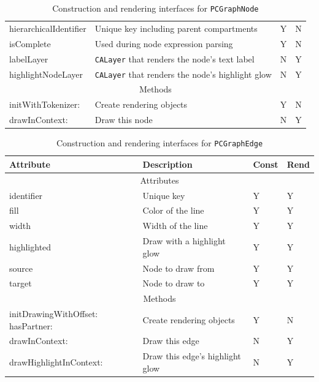 \begin{table}[htbp]
\begin{tabular}{ p{1.5in} p{3in} p{0.3in} p{0.3in}}
    hierarchicalIdentifier  & Unique key including parent compartments
    & Y & N \\
    isComplete & Used during node expression parsing
    & Y & N \\

    labelLayer  & \texttt{CALayer} that renders the node's text label
    & N & Y \\

    highlightNodeLayer  & \texttt{CALayer} that renders the node's highlight
    glow
    & N & Y \\

    \hline \multicolumn{4}{c}{Methods} \\ \hline

    initWithTokenizer: & Create rendering objects
    & Y & N \\

    drawInContext: & Draw this node
    & N & Y \\
\end{tabular}
    \caption{Construction and rendering interfaces for \texttt{PCGraphNode}}
    \label{fig:smda_node_interface}
\end{table}

\begin{table}[htbp]
\centering
\begin{tabular}{ p{1.5in} p{3in} p{0.3in} p{0.3in}}
    Attribute & Description & Const & Rend \\ \hline
    \hline \multicolumn{4}{c}{Attributes} \\ \hline

    identifier & Unique key  & Y & Y \\
    fill & Color of the line & Y & Y \\
    width & Width of the line & Y & Y \\
    highlighted & Draw with a highlight glow & Y & Y \\

    source & Node to draw from & Y & Y \\
    target & Node to draw to & Y & Y \\

    \hline \multicolumn{4}{c}{Methods} \\ \hline

    initDrawingWithOffset: hasPartner: & Create rendering objects
    & Y & N \\

    drawInContext: & Draw this edge
    & N & Y \\

    drawHighlightInContext: & Draw this edge's highlight glow
    & N & Y \\
\end{tabular}
    \caption{Construction and rendering interfaces for \texttt{PCGraphEdge}}
    \label{fig:smda_edge_interface}
\end{table}

